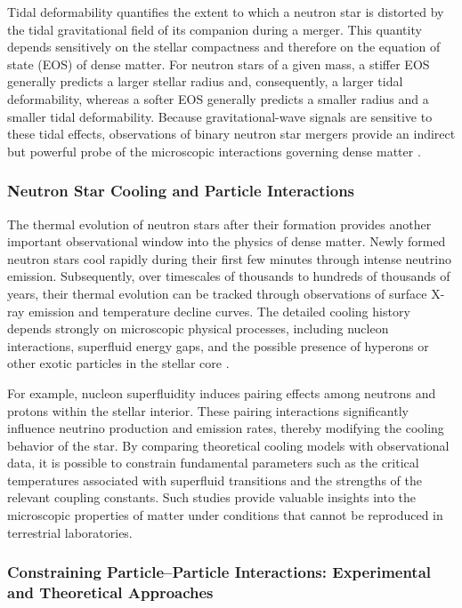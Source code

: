 Tidal deformability quantifies the extent to which a neutron star is distorted by the tidal gravitational field of its companion during a merger. This quantity depends sensitively on the stellar compactness and therefore on the equation of state (EOS) of dense matter. For neutron stars of a given mass, a stiffer EOS generally predicts a larger stellar radius and, consequently, a larger tidal deformability, whereas a softer EOS generally predicts a smaller radius and a smaller tidal deformability. Because gravitational-wave signals are sensitive to these tidal effects, observations of binary neutron star mergers provide an indirect but powerful probe of the microscopic interactions governing dense matter \cite{chatziioannou2020}.

\subsubsection{Neutron Star Cooling and Particle Interactions}

The thermal evolution of neutron stars after their formation provides another important observational window into the physics of dense matter. Newly formed neutron stars cool rapidly during their first few minutes through intense neutrino emission. Subsequently, over timescales of thousands to hundreds of thousands of years, their thermal evolution can be tracked through observations of surface X-ray emission and temperature decline curves. The detailed cooling history depends strongly on microscopic physical processes, including nucleon interactions, superfluid energy gaps, and the possible presence of hyperons or other exotic particles in the stellar core \cite{page2006,yakovlev2004}.

For example, nucleon superfluidity induces pairing effects among neutrons and protons within the stellar interior. These pairing interactions significantly influence neutrino production and emission rates, thereby modifying the cooling behavior of the star. By comparing theoretical cooling models with observational data, it is possible to constrain fundamental parameters such as the critical temperatures associated with superfluid transitions and the strengths of the relevant coupling constants. Such studies provide valuable insights into the microscopic properties of matter under conditions that cannot be reproduced in terrestrial laboratories.

\subsubsection{Constraining Particle--Particle Interactions: Experimental and Theoretical Approaches}

